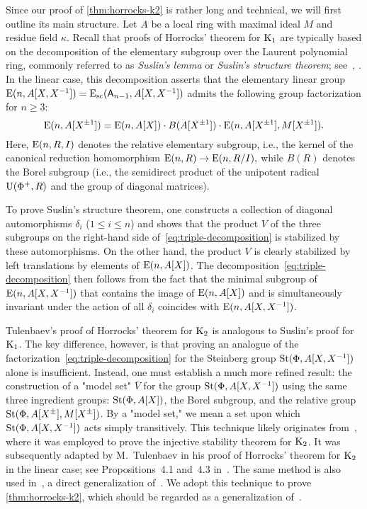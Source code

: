 Since our proof of \cref{thm:horrocks-k2} is rather long and technical, we will first outline its main structure.
Let \( A \) be a local ring with maximal ideal \( M \) and residue field \( \kappa \).
Recall that proofs of Horrocks' theorem for \( \operatorname{K}_1 \) are typically based on the decomposition of the elementary subgroup over the Laurent polynomial ring,
commonly referred to as \textit{Suslin's lemma} or \textit{Suslin's structure theorem}; see~\cite{Abe83, Su77}, \cite[\S~VI.6]{Lam10}.
In the linear case, this decomposition asserts that the elementary linear group
\( \operatorname{E}(n, A[X, X^{-1}]) = \operatorname{E}_\mathrm{sc}(\mathsf{A}_{n-1}, A[X, X^{-1}]) \) admits the following group factorization for \( n \geq 3 \):
\begin{equation}\label{eq:triple-decomposition}
\operatorname{E}(n, A[X^{\pm 1}]) = \operatorname{E}(n, A[X]) \cdot B(A[X^{\pm 1}]) \cdot \operatorname{E}(n, A[X^{\pm 1}], M[X^{\pm 1}]).
\end{equation}
Here, \( \operatorname{E}(n, R, I) \) denotes the relative elementary subgroup, i.e., the kernel of the canonical reduction homomorphism \( \operatorname{E}(n, R) \to \operatorname{E}(n, R/I), \)
while \( B(R) \) denotes the Borel subgroup (i.e., the semidirect product of the unipotent radical \( \operatorname{U}(\Phi^+, R) \) and the group of diagonal matrices).

To prove Suslin's structure theorem, one constructs a collection of diagonal automorphisms \( \delta_i \) (\( 1 \leq i \leq n \))
and shows that the product \( V \) of the three subgroups on the right-hand side of~\eqref{eq:triple-decomposition} is stabilized by these automorphisms.
On the other hand, the product \( V \) is clearly stabilized by left translations by elements of \( \operatorname{E}(n, A[X]) \).
The decomposition~\eqref{eq:triple-decomposition} then follows from the fact that the minimal subgroup of \( \operatorname{E}(n, A[X, X^{-1}]) \)
that contains the image of \( \operatorname{E}(n, A[X]) \) and is simultaneously invariant under the action of all \( \delta_i \)
coincides with \( \operatorname{E}(n, A[X, X^{-1}]) \).

Tulenbaev's proof of Horrocks' theorem for \( \operatorname{K}_2 \) is analogous to Suslin's proof for \( \operatorname{K}_1 \).
The key difference, however, is that proving an analogue of the factorization~\eqref{eq:triple-decomposition} for the Steinberg group
\( \operatorname{St}(\Phi, A[X, X^{-1}]) \) alone is insufficient.
Instead, one must establish a much more refined result: the construction of a "model set" \( \overline{V} \) for the group
\( \operatorname{St}(\Phi, A[X, X^{-1}]) \) using the same three ingredient groups: \( \operatorname{St}(\Phi, A[X]) \), the Borel subgroup, and the relative group
\( \operatorname{St}(\Phi, A[X^\pm], M[X^\pm]) \).
By a "model set," we mean a set upon which \( \operatorname{St}(\Phi, A[X, X^{-1}]) \) acts simply transitively.
This technique likely originates from~\cite{ST76}, where it was employed to prove the injective stability theorem for \( \operatorname{K}_2 \).
It was subsequently adapted by M.~Tulenbaev in his proof of Horrocks' theorem for \( \operatorname{K}_2 \) in the linear case; see Propositions~4.1 and~4.3 in~\cite{Tu83}.
The same method is also used in~\cite[Theorem~3]{LS20}, a direct generalization of~\cite[Proposition~4.3]{Tu83}.
We adopt this technique to prove \cref{thm:horrocks-k2}, which should be regarded as a generalization of~\cite[Proposition~4.1]{Tu83}.

